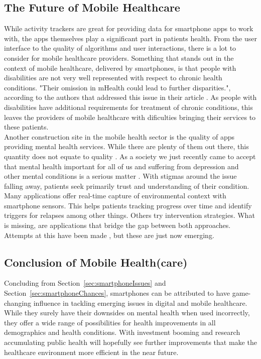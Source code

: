 \subsection{The Future of Mobile Healthcare}
While activity trackers are great for providing data for smartphone apps to work with, the apps themselves play a significant part in patients health. From the user interface to the quality of algorithms and user interactions, there is a lot to consider for mobile healthcare providers. Something that stands out in the context of mobile healthcare, delivered by smartphones, is that people with disabilities are not very well represented with respect to chronic health conditions. "Their omission in mHealth could lead to further disparities.", according to the authors that addressed this issue in their article \cite{jones2018mobile}. As people with disabilities have additional requirements for treatment of chronic conditions, this leaves the providers of mobile healthcare with dificulties bringing their services to these patients. \\
Another construction site in the mobile health sector is the quality of apps providing mental health services. While there are plenty of them out there, this quantity does not equate to quality \cite{torous2017needed}. As a society we just recently came to accept that mental health important for all of us and suffering from depression and other mental conditions is a serious matter \cite{bharadwaj2017mental}. With stigmas around the issue falling away, patients seek primarily trust and understanding of their condition. Many applications offer real-time capture of environmental context with smartphone sensors. This helps patients tracking progress over time and identify triggers for relapses among other things. Others try intervention strategies. What is missing, are applications that bridge the gap between both approaches. Attempts at this have been made \cite{torous2019creating}, but these are just now emerging.
\subsection{Conclusion of Mobile Health(care)}
Concluding from Section~\ref{sec:smartphoneIssues} and Section~\ref{sec:smartphoneChances}, smartphones can be attributed to have game-changing influence in tackling emerging issues in digital and mobile healthcare. While they surely have their downsides on mental health when used incorrectly, they offer a wide range of possibilities for health improvements in all demographics and health conditions. With investment booming \cite{safavi2019top} and research accumulating \cite{firth2016ecological} public health will hopefully see further improvements that make the healthcare environment more efficient in the near future.
